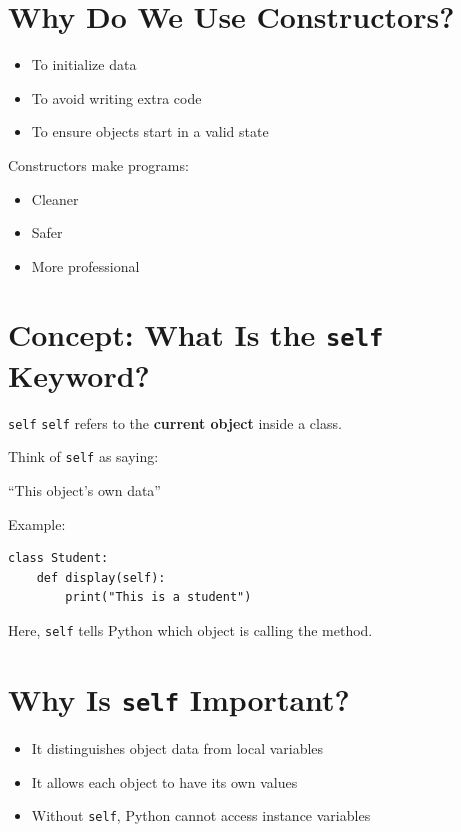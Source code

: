 \section{Why Do We Use Constructors?}

\begin{itemize}
    \item To initialize data
    \item To avoid writing extra code
    \item To ensure objects start in a valid state
\end{itemize}

Constructors make programs:
\begin{itemize}
    \item Cleaner
    \item Safer
    \item More professional
\end{itemize}

\section{Concept: What Is the \texttt{self} Keyword?}

\begin{definition}{\texttt{self}}
\texttt{self} refers to the \textbf{current object} inside a class.
\end{definition}

Think of \texttt{self} as saying:
\begin{center}
``This object’s own data''
\end{center}

Example:
\begin{verbatim}
class Student:
    def display(self):
        print("This is a student")
\end{verbatim}

Here, \texttt{self} tells Python which object is calling the method.

\section{Why Is \texttt{self} Important?}

\begin{itemize}
    \item It distinguishes object data from local variables
    \item It allows each object to have its own values
    \item Without \texttt{self}, Python cannot access instance variables
\end{itemize}

